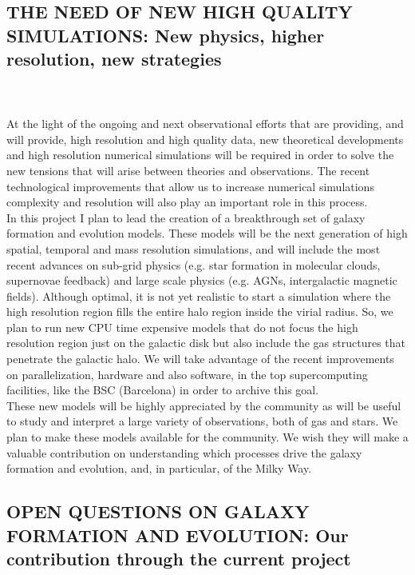 \documentclass[oneside, a4paper, onecolumn, 11pt]{article}
\begin{document}
\subsection*{ THE NEED OF NEW HIGH QUALITY SIMULATIONS: New physics, higher resolution, new strategies}\\
\\
At the light of the ongoing and next observational efforts that are providing, and will provide, high resolution and high quality data, new theoretical developments and high resolution numerical simulations will be required in order to solve the new tensions that will arise between theories and observations. The recent technological improvements that allow us to increase numerical simulations complexity and resolution will also play an important role in this process.\\
In this project I plan to lead the creation of a breakthrough set of galaxy formation and evolution models. These models will be the next generation of high spatial, temporal and mass resolution simulations, and will include the most recent advances on sub-grid physics (e.g. star formation in molecular clouds, supernovae feedback) and large scale physics (e.g. AGNs, intergalactic magnetic fields). Although optimal, it is not yet realistic to start a simulation where the high resolution region fills the entire halo region inside the virial radius. So, we plan to run new CPU time expensive models that do not focus the high resolution region just on the galactic disk but also include the gas structures that penetrate the galactic halo. We will take advantage of the recent improvements on parallelization, hardware and also software, in the top supercomputing facilities, like the BSC (Barcelona) in order to archive this goal.\\
These new models will be highly appreciated by the community as will be useful to study and interpret a large variety of observations, both of gas and stars. We plan to make these models available for the community. We wish they will make a valuable contribution on understanding which processes drive the galaxy formation and evolution, and, in particular, of the Milky Way.\\


\subsection*{ OPEN QUESTIONS ON GALAXY FORMATION AND EVOLUTION: Our contribution through the current project}\\
\end{document}
